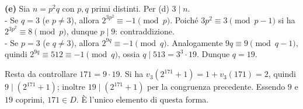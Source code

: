 \documentclass[11pt]{scrartcl}
\begin{document}
\textbf{(e)} Sia $n=p^2q$ con $p,q$ primi distinti. Per (d) $3\mid n$.\\

- Se $q=3$ (e $p\neq3$), allora $2^{3p^2}\equiv-1\pmod{p}$. Poiché $3p^2\equiv3\pmod{p-1}$
si ha $2^{3p^2}\equiv8\pmod{p}$, dunque $p\mid9$: contraddizione. \\
- Se $p=3$ (e $q\neq3$), allora $2^{9q}\equiv-1\pmod{q}$.
Analogamente $9q\equiv9\pmod{q-1}$, quindi $2^{9q}\equiv512\equiv-1\pmod{q}$,
ossia $q\mid513=3^3\cdot19$. Dunque $q=19$.

Resta da controllare $171=9\cdot19$. Si ha $v_3(2^{171}+1)=1+v_3(171)=2$,
quindi $9\mid(2^{171}+1)$; inoltre $19\mid(2^{171}+1)$ per la congruenza precedente.
Essendo $9$ e $19$ coprimi, $171\in D$. È l’unico elemento di questa forma.
\end{document}
